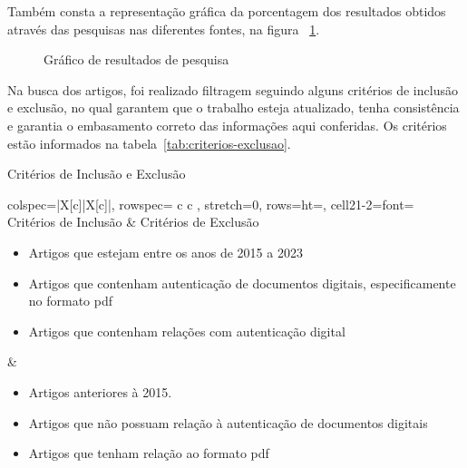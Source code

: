 Também consta a representação gráfica da porcentagem dos resultados obtidos
através das pesquisas nas diferentes fontes, na figura
~\ref{fig:grafico-resultados-pesquisa}.

\begin{figure}[h!]
    \caption[Gráfico de resultados da pesquisa]{Gráfico de resultados de
    pesquisa}
    \sourcesearchfootnote
    \label{fig:grafico-resultados-pesquisa}
\end{figure}

Na busca dos artigos, foi realizado filtragem seguindo alguns
critérios de inclusão e exclusão, no qual garantem que o trabalho
esteja atualizado, tenha consistência e garantia o embasamento
correto das informações aqui conferidas.
Os critérios estão informados na tabela~\ref{tab:criterios-exclusao}.

\begin{table}[h]
    \caption[Critérios de Inclusão e Exclusão]{Critérios de Inclusão e Exclusão}
    \begin{tblr}{
        colspec={|X[c]|X[c]|},
        rowspec={ c c },
        stretch=0,
        rows={ht=\baselineskip},
        cell{2}{1-2}={font=\small}
    }
        \hline
        Critérios de Inclusão & Critérios de Exclusão \\ \hline
        \begin{itemize}[leftmargin=10px]
            \item Artigos que estejam entre os anos de 2015 a 2023
            \item Artigos que contenham autenticação de documentos digitais,
            especificamente no formato \acrshort{pdf}
            \item Artigos que contenham relações com autenticação digital
        \end{itemize} &
        \begin{itemize}[leftmargin=10px]
            \item Artigos anteriores à 2015.
            \item Artigos que não possuam relação à autenticação de
            documentos digitais
            \item Artigos que tenham relação ao formato \acrshort{pdf}
        \end{itemize} \\ \hline
    \end{tblr}
    \sourcesearchfootnote
    \label{tab:criterios-exclusao}
\end{table}

